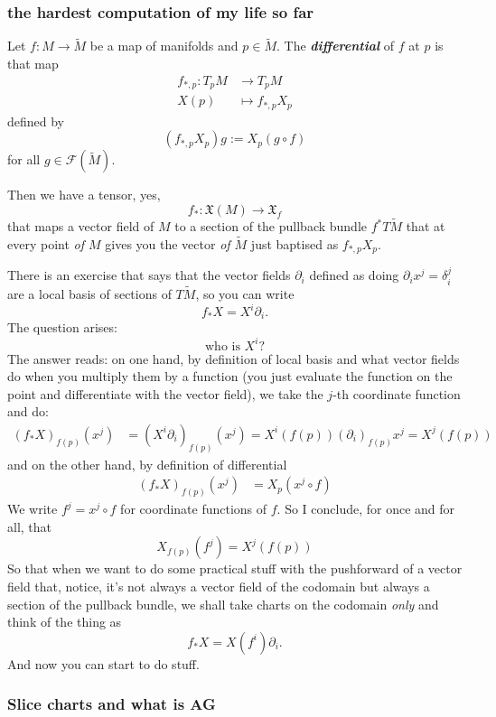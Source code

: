 \subsubsection{the hardest computation of my life so far}

Let \(f:M \to \tilde{M}\) be a map of manifolds and \(p \in \tilde{M}\).  The \textit{\textbf{differential}} of \(f\) at \(p\) is that map
\begin{align*}
	f_{*,p}: T_pM &\longrightarrow T_pM \\
	X(p) &\longmapsto f_{*,p}X_p
\end{align*}
defined by
\[(f_{*,p}X_p)g:=X_p(g \circ f)\]
for all \(g \in \mathcal{F}(\tilde{M})\).

Then we have a tensor, yes,
\[f_*:\mathfrak{X}(M) \longrightarrow \mathfrak{X}_f\]
that maps a vector field of \(M\) to a section of the pullback bundle \(f^*T\tilde{M}\) that at every point  \textit{of \(M\)} gives you the vector \textit{of \(\tilde{M}\)} just baptised as \(f_{*,p}X_p\).

There is an exercise that says that the vector fields \(\partial_i\) defined as doing \(\partial_i x^j=\delta_i^j\) are a local basis of sections of \(T\tilde{M}\), so you can write
\[f_* X=X^i\partial_i.\]
The question arises:
\[\text{who is } X^i\text{?} \]
The answer reads: on one hand, by definition of local basis and what vector fields do when you multiply them by a function (you just evaluate the function on the point and differentiate with the vector field), we take the \(j\)-th coordinate function and do:
\begin{align*}
	(f_*X)_{f(p)}(x^j)&=(X^i \partial_i)_{f(p)}(x^j)=X^i(f(p))(\partial_i)_{f(p)}x^j=X^j(f(p))
\end{align*}
and on the other hand, by definition of differential
\begin{align*}
	(f_*X)_{f(p)}(x^j)&=X_p(x^j\circ f)
\end{align*}
We write \(f^j=x^j \circ f\) for coordinate functions of \(f\). So I conclude, for once and for all, that
\[X_{f(p)}(f^j)=X^j(f(p))\]
So that when we want to do some practical stuff with the pushforward of a vector field that, notice, it's not always a vector field of the codomain but always a section of the pullback bundle, we shall take charts on the codomain \textit{only} and think of the thing as
\[f_*X=X(f^i)\partial_i.\]
And now you can start to do stuff.

\subsubsection{Slice charts and what is AG}

